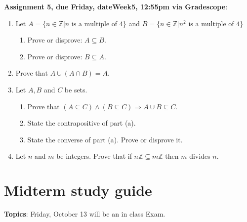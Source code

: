 \documentclass[12pt]{article}
\newcommand{\HWdueTime}{12:55pm }
\newcommand{\Z}{{\mathbb Z}}
\begin{document}
\smallskip
\noindent \textbf{Assignment 5, due Friday, \csname dateWeek5\endcsname, \HWdueTime via Gradescope}:
\begin{enumerate}
\item Let $A = \{ n \in \Z | n \text{ is a multiple of } 4\}$ and $B = \{ n \in \Z | n^2 \text{ is a multiple of } 4\}$ 
 \begin{enumerate}
 \item Prove or disprove: $A \subseteq B$. 
 \item Prove or disprove: $B \subseteq A$. 
 \end{enumerate}

\item Prove that $A \cup (A \cap B) = A.$
\item Let $A,B$ and $C$ be sets. 
 \begin{enumerate}
 \item Prove that $(A \subseteq C) \wedge (B \subseteq C) \Rightarrow A \cup B \subseteq C$.
 \item State the contrapositive of part (a).
 \item State the converse of part (a). Prove or disprove it.
 \end{enumerate}
\item Let $n$ and $m$ be integers. Prove that if $n\Z \subseteq m\Z$ then $m$ divides $n$.
\end{enumerate}


\newpage
\section[ (October 13) Midterm]{Midterm study guide}

\noindent\textbf{Topics}: Friday, October 13 will be an in class Exam.
\\
\end{document}

